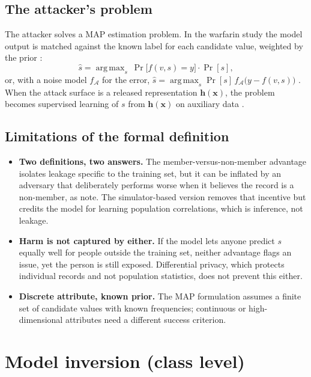 \documentclass[10pt,a4paper]{extarticle}
\theoremstyle{definition}
\newcommand{\x}{\mathbf{x}}
\DeclareMathOperator*{\argmax}{arg\,max}
\begin{document}
\subsection{The attacker's problem}

The attacker solves a MAP estimation problem. In the warfarin study the model output is matched against the known label for each candidate value, weighted by the prior \citep{fredrikson2014privacy}:
\[
\hat s=\argmax_{s}\ \Pr\big[f(v,s)=y\big]\cdot\Pr[s],
\]
or, with a noise model $f_{\mathcal{A}}$ for the error, $\hat s=\argmax_s\Pr[s]\,f_{\mathcal{A}}\big(y-f(v,s)\big)$ \citep{yeom2018privacy}. When the attack surface is a released representation $\mathbf{h}(\x)$, the problem becomes supervised learning of $s$ from $\mathbf{h}(\x)$ on auxiliary data \citep{song2020overlearning}.

\subsection{Limitations of the formal definition}

\begin{itemize}[leftmargin=1.5em]
  \item \textbf{Two definitions, two answers.} The member-versus-non-member advantage isolates leakage specific to the training set, but it can be inflated by an adversary that deliberately performs worse when it believes the record is a non-member, as \citet{yeom2018privacy} note. The simulator-based version removes that incentive but credits the model for learning population correlations, which is inference, not leakage.
  \item \textbf{Harm is not captured by either.} If the model lets anyone predict $s$ equally well for people outside the training set, neither advantage flags an issue, yet the person is still exposed. Differential privacy, which protects individual records and not population statistics, does not prevent this either.
  \item \textbf{Discrete attribute, known prior.} The MAP formulation assumes a finite set of candidate values with known frequencies; continuous or high-dimensional attributes need a different success criterion.
\end{itemize}

\section{Model inversion (class level)}\label{sec:inversion}
\end{document}
